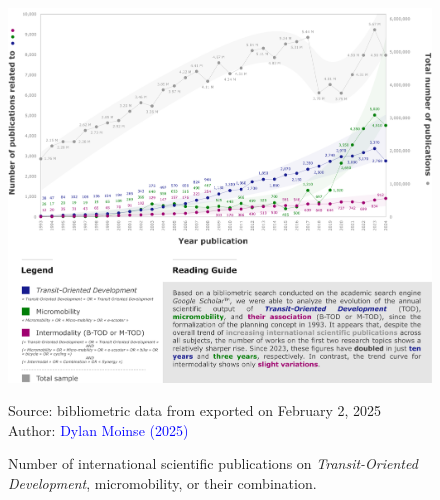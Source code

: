\begin{refsegment}
\begin{figure}[h!]\vspace*{4pt}
    \caption{Number of international scientific publications on \textsl{Transit-Oriented Development}, micromobility, or their combination.}
    \label{fig-chap1:trends-google-scholar}
    \centerline{\includegraphics[width=1\columnwidth]{src/Figures/Chap-1/EN_Chronologie_publications_TOD_MIL.pdf}}
    \vspace{5pt}
    \begin{flushright}\scriptsize{
    Source: bibliometric data from  exported on February 2, 2025
    \\
    Author: \textcolor{blue}{Dylan Moinse (2025)}
    }\end{flushright}
\end{figure}


\end{refsegment}

